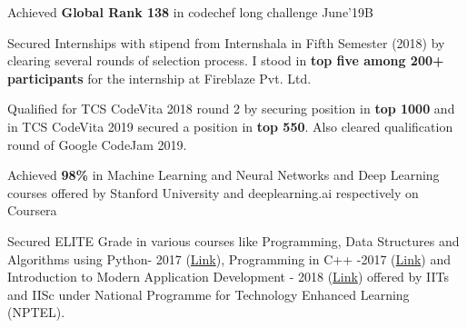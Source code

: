 \begin{cventries}
\begin{cvitems}
 \item {\fontsize{9pt}{1em}\bodyfontlight\upshape\color{text} Achieved \textbf{Global Rank 138} in codechef long challenge June’19B }
 \item {\fontsize{9pt}{1em}\bodyfontlight\upshape\color{text} {Secured Internships with stipend from Internshala in Fifth Semester (2018) by clearing several rounds of selection process. I stood in \textbf{top five among 200+ participants} for the internship at Fireblaze Pvt. Ltd.}}
 \item{\fontsize{9pt}{1em}\bodyfontlight\upshape\color{text} Qualified for TCS CodeVita 2018 round 2 by securing position in \textbf{top 1000} and in TCS CodeVita 2019 secured a position in \textbf{top 550}. Also cleared qualification round of Google CodeJam 2019.}
  \item {\fontsize{9pt}{1em}\bodyfontlight\upshape\color{text} {Achieved \textbf{98\%} in Machine Learning and Neural Networks and Deep Learning courses offered by Stanford University and deeplearning.ai respectively on Coursera }}
\item {\fontsize{9pt}{1em}\bodyfontlight\upshape\color{text} Secured ELITE Grade in various courses like Programming, Data Structures and Algorithms using Python- 2017 (\href{https://nptel.ac.in/noc/Ecertificate/?q=noc17-cs28/NPTEL17CS28S1140194171011045.jpg}{Link}), Programming in C++ -2017 (\href{https://nptel.ac.in/noc/Ecertificate/?q=noc17-cs24/NPTEL17CS24S2150185171011045.jpg}{Link}) and Introduction to Modern Application Development - 2018 (\href{https://nptel.ac.in/noc/Ecertificate/?q=noc18-cs03/NPTEL18CS03S31601201810063149.jpg}{Link}) offered by IITs and IISc under National Programme for Technology Enhanced Learning (NPTEL).}
       
\end{cvitems}
   \vspace{0.5 cm}   
\end{cventries}
